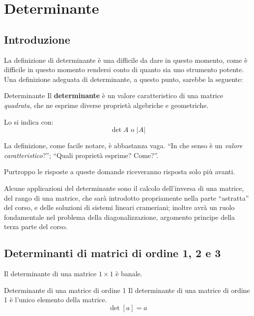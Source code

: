 \chapter{Determinante}
\section{Introduzione}
La definizione di determinante è una difficile da dare in questo momento, come è difficile in questo momento rendersi conto di quanto sia uno strumento potente. Una definizione adeguata di determinante, a questo punto, sarebbe la seguente:
\begin{newdef}{Determinante}
    Il \textbf{determinante} è un valore caratteristico di una matrice \textit{quadrata}, che ne esprime diverse proprietà algebriche e geometriche.

    Lo si indica con:
    \[
        \det A \text{ o } |A|
    \]
\end{newdef}
La definizione, come facile notare, è abbastanza vaga. ``In che senso è un \textit{valore caratteristico}?''; ``Quali proprietà esprime? Come?''.

Purtroppo le risposte a queste domande riceveranno risposta solo più avanti.

Alcune applicazioni del determinante sono il calcolo dell'inversa di una matrice, del rango di una matrice, che sarà introdotto propriamente nella parte ``astratta'' del corso, e delle soluzioni di sistemi lineari crameriani; inoltre avrà un ruolo fondamentale nel problema della diagonalizzazione, argomento principe della terza parte del corso.

\section{Determinanti di matrici di ordine 1, 2 e 3}
Il determinante di una matrice $1 \times 1$ è banale.

\begin{teo}{Determinante di una matrice di ordine 1}
    Il determinante di una matrice di ordine 1 è l'unico elemento della matrice.
    \[
        \det[a] = a
    \]
\end{teo}


